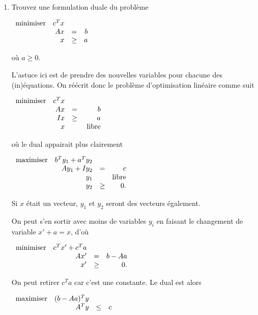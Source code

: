 \begin{enumerate}
  \item Trouvez une formulation duale du  problème

    $
    \begin{array}{lrcr}
      \mbox{minimiser} & c^T x\\
      & A x & = &  b\\
      & x   & \geq & a
    \end{array}
    $

    où $a \geq 0$.

    \begin{solution}
      L'astuce ici est de prendre des nouvelles variables pour chacune des
      (in)équations.
      On réécrit donc le problème d'optimisation linéaire comme suit

      $
      \begin{array}{lrcr}
        \mbox{minimiser} & c^T x\\
        & A x & = &  b\\
        & I x   & \geq & a\\
        & x & & \mbox{ libre}
      \end{array}
      $

      où le dual appairait plus clairement

      $
      \begin{array}{lrcr}
        \mbox{maximiser} & b^Ty_1+a^Ty_2\\
        & Ay_1 + Iy_2 & = & c\\
        & y_1 & & \text{libre}\\
        & y_2 & \geq & 0.
      \end{array}
      $

      Si $x$ était un vecteur, $y_1$ et $y_2$ seront des vecteurs également.

      On peut s'en sortir avec moins de variables $y_i$ en faisant
      le changement de variable $x' + a = x$, d'où

      $
      \begin{array}{lrcr}
        \mbox{minimiser} & c^T x' + c^Ta\\
        & A x' & = &  b - Aa\\
        & x'   & \geq & 0.
      \end{array}
      $

      On peut retirer $c^Ta$ car c'est une constante.
      Le dual est alors

      $
      \begin{array}{lrcr}
        \mbox{maximiser} & (b-Aa)^Ty\\
        & A^Ty & \leq & c
      \end{array}
      $


\end{solution}
\end{enumerate}
